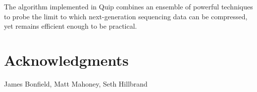 \documentclass[twocolumn]{article}
\begin{document}

The algorithm implemented in Quip combines an ensemble of powerful techniques
to probe the limit to which next-generation sequencing data can be compressed,
yet remains efficient enough to be practical.

\section*{Acknowledgments}

James Bonfield, Matt Mahoney, Seth Hillbrand




\end{document}
